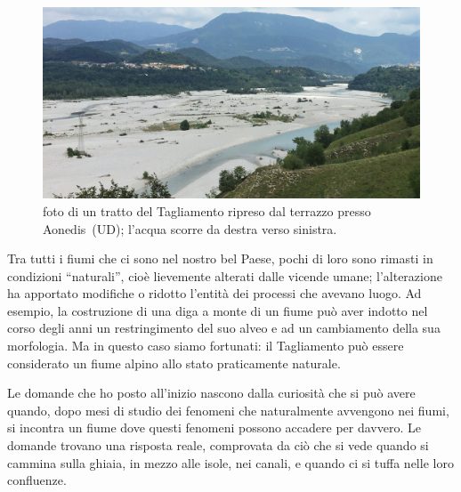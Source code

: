 \begin{figure}
	\centering
	\includegraphics[width=\textwidth]{files/foto_terrazzo_valle_pinzano.jpg}
	\caption[foto di un tratto del Tagliamento ripreso dal terrazzo presso Aonedis~(UD)]{foto di un tratto del Tagliamento ripreso dal terrazzo presso Aonedis~(UD); l'acqua scorre da destra verso sinistra. 
	}
	\label{fig:foto-pinzano}
\end{figure}


Tra tutti i fiumi che ci sono nel nostro bel Paese, pochi di loro sono rimasti in condizioni “naturali”, cioè lievemente alterati dalle vicende umane; l'alterazione ha apportato modifiche o ridotto l'entità dei processi che avevano luogo. 
Ad esempio, la costruzione di una diga a monte di un fiume può aver indotto nel corso degli anni un restringimento del suo alveo e ad un cambiamento della sua morfologia.
Ma in questo caso siamo fortunati: il Tagliamento può essere considerato un fiume alpino allo stato praticamente naturale.

Le domande che ho posto all'inizio nascono dalla curiosità che si può avere quando, dopo mesi di studio dei fenomeni che naturalmente avvengono nei fiumi, si incontra un fiume dove questi fenomeni possono accadere per davvero. Le domande trovano una risposta reale, comprovata da ciò che si vede quando si cammina sulla ghiaia, in mezzo alle isole, nei canali, e quando ci si tuffa nelle loro confluenze.


